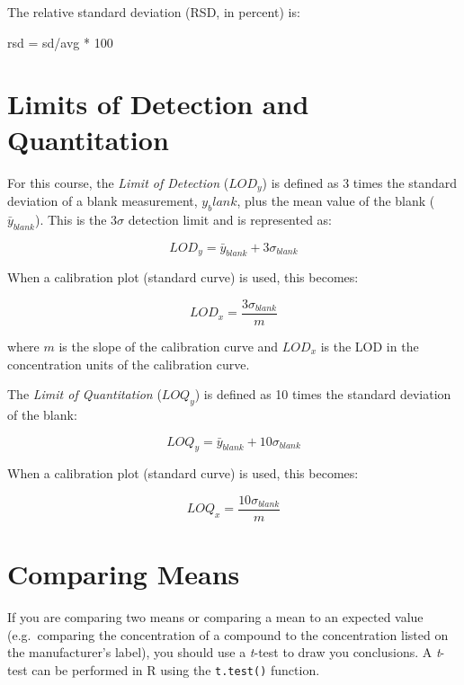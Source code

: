 \documentclass[]{tufte-book}
\newenvironment{Shaded}{}{}
\newcommand{\DecValTok}[1]{\textcolor[rgb]{0.25,0.63,0.44}{#1}}
\newcommand{\NormalTok}[1]{#1}
\newcommand{\OperatorTok}[1]{\textcolor[rgb]{0.40,0.40,0.40}{#1}}
\newcommand{\StringTok}[1]{\textcolor[rgb]{0.25,0.44,0.63}{#1}}
\begin{document}
The relative standard deviation (RSD, in percent) is:

\begin{Shaded}
\begin{Highlighting}[]
\NormalTok{rsd =}\StringTok{ }\NormalTok{sd}\OperatorTok{/}\NormalTok{avg }\OperatorTok{*}\StringTok{ }\DecValTok{100}
\end{Highlighting}
\end{Shaded}

\hypertarget{limits-of-detection-and-quantitation}{%
\section*{Limits of Detection and Quantitation}\label{limits-of-detection-and-quantitation}}

For this course, the \emph{Limit of Detection} (\(LOD_y\)) is defined as 3 times the standard deviation of a blank measurement, \(y_blank\), plus the mean value of the blank (\(\bar{y}_{blank}\)). This is the 3\(\sigma\) detection limit and is represented as:

\[
LOD_y = \bar{y}_{blank} + 3\sigma_{blank}
\]

When a calibration plot (standard curve) is used, this becomes:

\[
LOD_x = \frac{3\sigma_{blank}}{m}
\]

\noindent where \(m\) is the slope of the calibration curve and \(LOD_x\) is the LOD in the concentration units of the calibration curve.

The \emph{Limit of Quantitation} (\(LOQ_y\)) is defined as 10 times the standard deviation of the blank:

\[
LOQ_y = \bar{y}_{blank} + 10\sigma_{blank}
\]

When a calibration plot (standard curve) is used, this becomes:

\[
LOQ_x = \frac{10\sigma_{blank}}{m}
\]

\hypertarget{comparing-means}{%
\section*{Comparing Means}\label{comparing-means}}

If you are comparing two means or comparing a mean to an expected value (e.g.~comparing the concentration of a compound to the concentration listed on the manufacturer's label), you should use a \emph{t}-test to draw you conclusions. A \emph{t}-test can be performed in R using the \texttt{t.test()} function.
\end{document}
